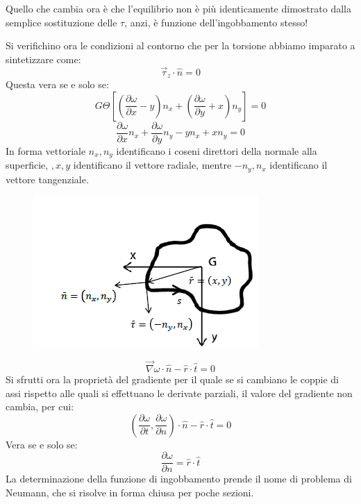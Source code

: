 		Quello che cambia ora è che l'equilibrio non è più identicamente dimostrato dalla semplice sostituzione delle $\tau$, anzi, è funzione dell'ingobbamento stesso! \newline 
		
		Si verifichino ora le condizioni al contorno che per la torsione abbiamo imparato a sintetizzare come: 
		\[\vec{\tau}_z \cdot \hat{n} = 0\]
		Questa vera se e solo se: 
		\[ G\Theta \left[\left(\dfrac{\partial \omega}{\partial x} - y\right)n_x + \left(\dfrac{\partial \omega}{\partial y} +x\right)n_y\right] = 0\]
		\[ \dfrac{\partial \omega}{\partial x}n_x + \dfrac{\partial \omega}{\partial y}n_y - yn_x  + xn_y = 0\]
		In forma vettoriale $n_x, n_y$ identificano i coseni direttori della normale alla superficie, $,x,y$ identificano il vettore radiale, mentre $ -n_y, n_x$ identificano il vettore tangenziale.
		
\begin{figure}[H]
	\centering
	\includegraphics[width=0.5\linewidth]{immagini_5/screenshot004}
	\label{fig:screenshot004}
\end{figure}
		
		\[ \vec{\nabla}\omega \cdot \hat{n} - \hat{r} \cdot \hat{t} = 0\]
		Si sfrutti ora la proprietà del gradiente per il quale se si cambiano le coppie di assi rispetto alle quali si effettuano le derivate parziali, il valore del gradiente non cambia, per cui:
		\[ \left(\dfrac{\partial \omega}{\partial t}, \dfrac{\partial \omega}{\partial n} \right)\cdot \hat{n} - \hat{r} \cdot \hat{t} = 0\]
		Vera se e solo se: 
		\[ \boxed{\dfrac{\partial \omega}{\partial n} = \hat{r} \cdot \hat{t}}\]
		La determinazione della funzione di
		ingobbamento prende il nome di problema di Neumann, che si risolve in forma chiusa per poche sezioni. \newline 
		
